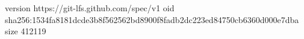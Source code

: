 version https://git-lfs.github.com/spec/v1
oid sha256:1534fa8181dcde3b8f562562bd8900f8fadb2dc223ed84750cb6360d000e7dba
size 412119
